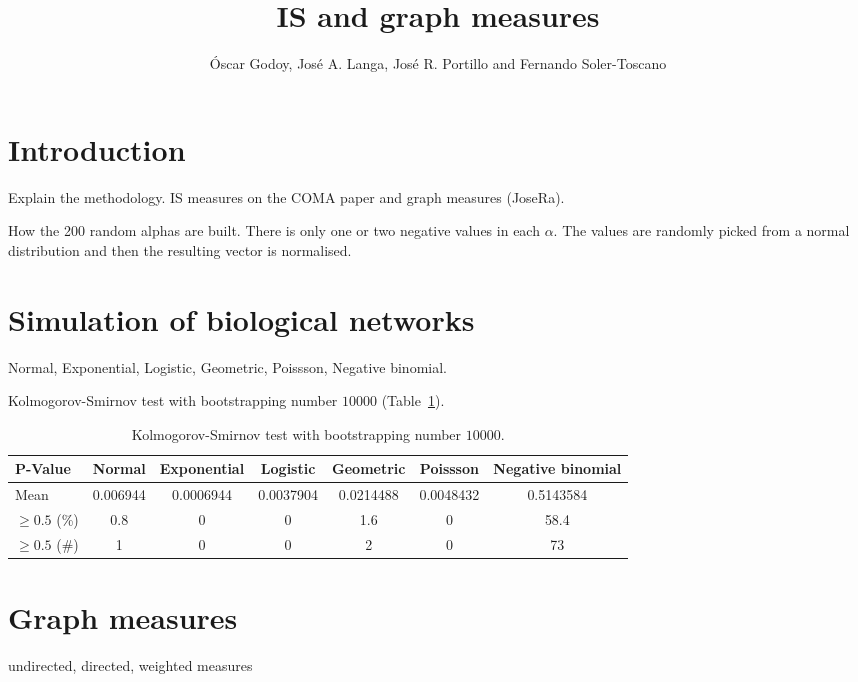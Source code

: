 \documentclass{article}
\begin{document}
\title{IS and graph measures}
\author{\'Oscar Godoy, Jos\'e A. Langa,  Jos\'e R. Portillo and Fernando Soler-Toscano}
\maketitle{}

\section{Introduction}
\label{sec:introduction}

Explain the methodology. IS measures on the COMA paper and graph
measures (JoseRa).

How the 200 random alphas are built. There is only one or two negative
values in each $\alpha$. The values are randomly picked from a normal
distribution and then the resulting vector is normalised. 

\section{Simulation of biological networks}
Normal, Exponential, Logistic, Geometric, Poissson, Negative binomial.

Kolmogorov-Smirnov test with bootstrapping number $10000$ (Table~\ref{tab:ksboot}).
\begin{table}[hbtp]

    \centering
    \begin{tabular}{|l|c|c|c|c|c|c|}
        \hline
         P-Value & Normal & Exponential & Logistic 
         & Geometric & Poissson & Negative binomial\\ \hline
         Mean & 0.006944 & 0.0006944 & 0.0037904 
         & 0.0214488 & 0.0048432 & 0.5143584 \\ \hline
         $\ge 0.5$ (\%) & 0.8 & 0 & 0 & 1.6 & 0 & 58.4  \\ \hline
         $\ge 0.5$ (\#) & 1 & 0 & 0 & 2 & 0 & 73  \\ \hline
    \end{tabular}
    \caption{Kolmogorov-Smirnov test with bootstrapping number $10000$.}
    \label{tab:ksboot}
\end{table}


\section{Graph measures}

undirected, directed, weighted measures
\end{document}
